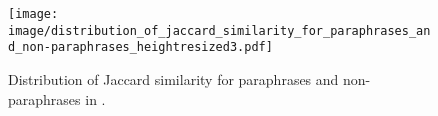 \begin{figure}[t]
 \centering
  \texttt{[image: image/distribution\_of\_jaccard\_similarity\_for\_paraphrases\_and\_non-paraphrases\_heightresized3.pdf]}
 \caption{Distribution of Jaccard similarity for paraphrases and non-paraphrases in \dataset.}
 \label{fig:dist_of_jaccard_similarity}
\end{figure}